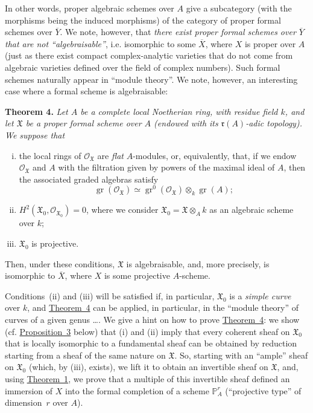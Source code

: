 \documentclass{article}
\newenvironment{itenv}[1]
  {\phantomsection\par\medskip\noindent\textbf{#1.}\itshape}
  {\medskip}
\newcommand{\scr}[1]{{\mathscr{#1}}}
\newcommand{\fk}{\mathfrak}
\newcommand{\PP}{\mathbb{P}}
\DeclareMathOperator{\gr}{gr}
\newcommand{\oldpage}[1]{\marginpar{\footnotesize$\Big\vert$ \textit{p.~#1}}}
\begin{document}
In other words, proper algebraic schemes over $A$ give a subcategory (with the morphisms being the induced morphisms) of the category of proper formal schemes over $\overline{Y}$.
We note, however, that \emph{there exist proper formal schemes over $\overline{Y}$ that are not ``algebraisable''}, i.e. isomorphic to some $\overline{X}$, where $X$ is proper over $A$ (just as there exist compact complex-analytic varieties that do not come from algebraic varieties defined over the field of complex numbers).
Such formal schemes naturally appear in ``module theory''.
We note, however, an interesting case where a formal scheme is algebraisable:

\begin{itenv}{Theorem 4}
\label{theorem4}
  Let $A$ be a complete local Noetherian ring, with residue field $k$, and let $\fk{X}$ be a proper formal scheme over $A$ (endowed with its $\mathfrak{r}(A)$-adic topology).
  We suppose that
  \begin{enumerate}[i.]
    \item the local rings of $\scr{O}_{\fk{X}}$ are \emph{flat} $A$-modules, or, equivalently, that, if we endow $\scr{O}_{\fk{X}}$ and $A$ with the filtration given by powers of the maximal ideal of $A$, then the associated graded algebras satisfy
      \[
        \gr(\scr{O}_{\fk{X}}) \simeq \gr^0(\scr{O}_{\fk{X}})\otimes_k\gr(A);
      \]
    \item $H^2(\fk{X}_0,\scr{O}_{\fk{X}_0})=0$, where we consider $\fk{X}_0=\fk{X}\otimes_Ak$ as an algebraic scheme over $k$;
\oldpage{182-07}
    \item $\fk{X}_0$ is projective.
  \end{enumerate}
  Then, under these conditions, $\fk{X}$ is algebraisable, and, more precisely, is isomorphic to $\overline{X}$, where $X$ is some projective $A$-scheme.
\end{itenv}

Conditions~(ii) and (iii) will be satisfied if, in particular, $\fk{X}_0$ is a \emph{simple curve} over $k$, and \hyperref[theorem4]{Theorem~4} can be applied, in particular, in the ``module theory'' of curves of a given genus \ldots.
We give a hint on how to prove \hyperref[theorem4]{Theorem~4}:
we show (cf. \hyperref[proposition3]{Proposition~3} below) that (i) and (ii) imply that every coherent sheaf on $\fk{X}_0$ that is locally isomorphic to a fundamental sheaf can be obtained by reduction starting from a sheaf of the same nature on $\fk{X}$.
So, starting with an ``ample'' sheaf on $\fk{X}_0$ (which, by (iii), exists), we lift it to obtain an invertible sheaf on $\fk{X}$, and, using \hyperref[theorem1]{Theorem~1}, we prove that a multiple of this invertible sheaf defined an immersion of $X$ into the formal completion of a scheme $\PP_A^r$ (``projective type'' of dimension~$r$ over $A$).
\end{document}
